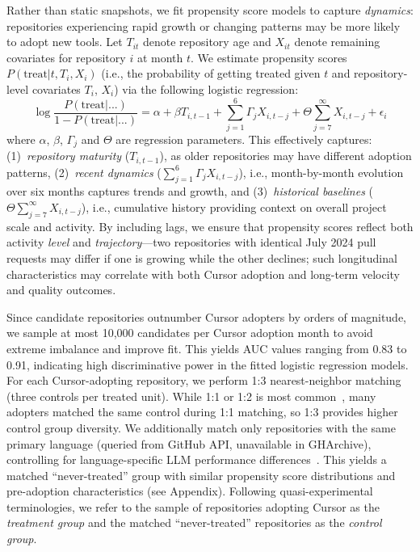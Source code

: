 Rather than static snapshots, we fit propensity score models to capture \textit{dynamics}: repositories experiencing rapid growth or changing patterns may be more likely to adopt new tools. Let $T_{it}$ denote repository age and $X_{it}$ denote remaining covariates for repository $i$ at month $t$.
We estimate propensity scores $P(\text{treat}|t, T_i, X_i)$ (i.e., the probability of getting treated given $t$ and repository-level covariates $T_i$, $X_i$) via the following logistic regression:
\begin{equation}
\log\frac{P(\text{treat}|...)}{1-P(\text{treat}|...)} = \alpha + \beta T_{i, t-1} + \sum_{j=1}^{6}\Gamma_j X_{i,t-j} + \Theta\sum_{j=7}^{\infty}X_{i,t-j} + \epsilon_{i}
\end{equation}
where $\alpha$, $\beta$, $\Gamma_j$ and $\Theta$ are regression parameters. This effectively captures: (1)~\textit{repository maturity} ($T_{i,t-1}$), as older repositories may have different adoption patterns, (2)~\textit{recent dynamics} ($\sum_{j=1}^{6}\Gamma_j X_{i,t-j}$), i.e., month-by-month evolution over six months captures trends and growth, and (3)~\textit{historical baselines} ($\Theta\sum_{j=7}^{\infty}X_{i,t-j}$), i.e., cumulative history providing context on overall project scale and activity.
By including lags, we ensure that propensity scores reflect both activity \textit{level} and \textit{trajectory}---two repositories with identical July 2024 pull requests may differ if one is growing while the other declines; such longitudinal characteristics may correlate with both Cursor adoption and long-term velocity and quality outcomes.

Since candidate repositories outnumber Cursor adopters by orders of magnitude, we sample at most 10,000 candidates per Cursor adoption month to avoid extreme imbalance and improve fit. This yields AUC values ranging from 0.83 to 0.91, indicating high discriminative power in the fitted logistic regression models.
For each Cursor-adopting repository, we perform 1:3 nearest-neighbor matching (three controls per treated unit). 
While 1:1 or 1:2 is most common~\cite{austin2010statistical, rassen2012one}, many adopters matched the same control during 1:1 matching, so 1:3 provides higher control group diversity. 
We additionally match only repositories with the same primary language (queried from GitHub API, unavailable in GHArchive), controlling for language-specific LLM performance differences~\cite{DBLP:journals/pacmpl/CassanoGLSFAF0J24, DBLP:journals/corr/abs-2503-17181}. 
This yields a matched ``never-treated'' group with similar propensity score distributions and pre-adoption characteristics (see Appendix).
Following quasi-experimental terminologies, we refer to the sample of repositories adopting Cursor as the \emph{treatment group} and the matched ``never-treated'' repositories as the \emph{control group}.

